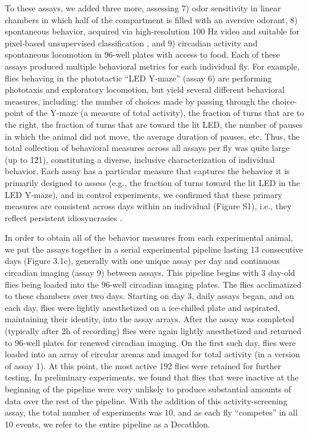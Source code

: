 \documentclass[12pt,letterpaper]{article}
\begin{document}
To these assays, we added three more, assessing 7) odor sensitivity in linear chambers \cite{Claridge-Chang_Writing_2009} in which half of the compartment is filled with an aversive odorant, 8) spontaneous behavior, acquired via high-resolution 100 Hz video and suitable for pixel-based unsupervised classification \cite{berman_choi_bialek_shaevitz_2014}, and 9) circadian activity and spontaneous locomotion in 96-well plates with access to food. Each of these assays produced multiple behavioral metrics for each individual fly. For example, flies behaving in the phototactic “LED Y-maze” (assay 6) are performing phototaxis and exploratory locomotion, but yield several different behavioral measures, including: the number of choices made by passing through the choice-point of the Y-maze (a measure of total activity), the fraction of turns that are to the right, the fraction of turns that are toward the lit LED, the number of pauses in which the animal did not move, the average duration of pauses, etc. Thus, the total collection of behavioral measures across all assays per fly was quite large (up to 121), constituting a diverse, inclusive characterization of individual behavior. Each assay has a particular measure that captures the behavior it is primarily designed to assess (e.g., the fraction of turns toward the lit LED in the LED Y-maze), and in control experiments, we confirmed that these primary measures are consistent across days within an individual (Figure S1), i.e., they reflect persistent idiosyncrasies \cite{Kain_Phototactic_2012,Buchanan_Neuronal_2015,Kain_Variability_2015}. 

In order to obtain all of the behavior measures from each experimental animal, we put the assays together in a serial experimental pipeline lasting 13 consecutive days (Figure 3.1c), generally with one unique assay per day and continuous circadian imaging (assay 9) between assays. This pipeline begins with 3 day-old flies being loaded into the 96-well circadian imaging plates. The flies acclimatized to these chambers over two days. Starting on day 3, daily assays began, and on each day, flies were lightly anesthetized on a ice-chilled plate and aspirated, maintaining their identity, into the assay arrays. After the assay was completed (typically after 2h of recording) flies were again lightly anesthetized and returned to 96-well plates for renewed circadian imaging. On the first such day, flies were loaded into an array of circular arenas and imaged for total activity (in a version of assay 1). At this point, the most active 192 flies were retained for further testing. In preliminary experiments, we found that flies that were inactive at the beginning of the pipeline were very unlikely to produce substantial amounts of data over the rest of the pipeline. With the addition of this activity-screening assay, the total number of experiments was 10, and as each fly “competes” in all 10 events, we refer to the entire pipeline as a Decathlon. 
\end{document}
